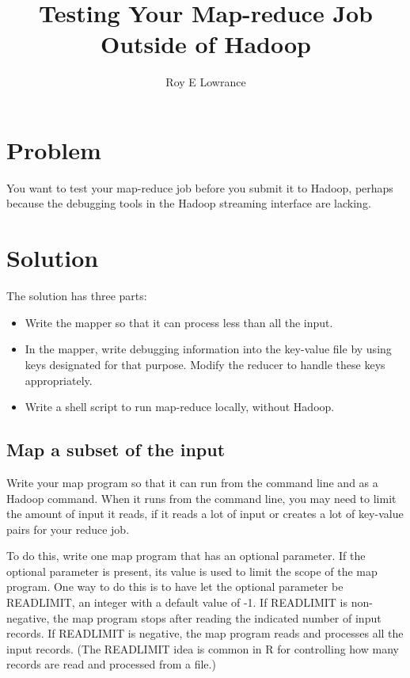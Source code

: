 \documentclass{article}
\begin{document}
\title{Testing Your Map-reduce Job Outside of Hadoop}
\author{Roy E Lowrance}
\maketitle


\section{Problem}

You want to test your map-reduce job before you submit it to Hadoop, perhaps because the 
debugging tools in the Hadoop streaming interface are lacking.

\section{Solution}

The solution has three parts:
\begin{itemize}
  \item Write the mapper so that it can process less than all the input.
  \item In the mapper, write debugging information into the key-value
    file by using  keys designated for that purpose. Modify the reducer to
    handle these keys appropriately.
  \item Write a shell script to run map-reduce locally, without
    Hadoop.
\end{itemize}

\subsection{Map a subset of the input}

Write your map program so that it can run from the command line and as a
Hadoop command. When it runs from the command line, you may need to
limit the amount of input it reads, if it reads a lot of input or
creates a lot of key-value pairs for your reduce job.

To do this, write one map program that has an optional parameter. If the
optional parameter is present, its value is used to limit the scope of
the map program. One way to do this is to have let the optional
parameter be READLIMIT, an integer with a default value of -1. If
READLIMIT is non-negative, the map program stops after reading the
indicated number of input records. If READLIMIT is negative, the map
program reads and processes all the input records. (The READLIMIT idea
is common in R for controlling how many records are read and processed
from a file.)
\end{document}
